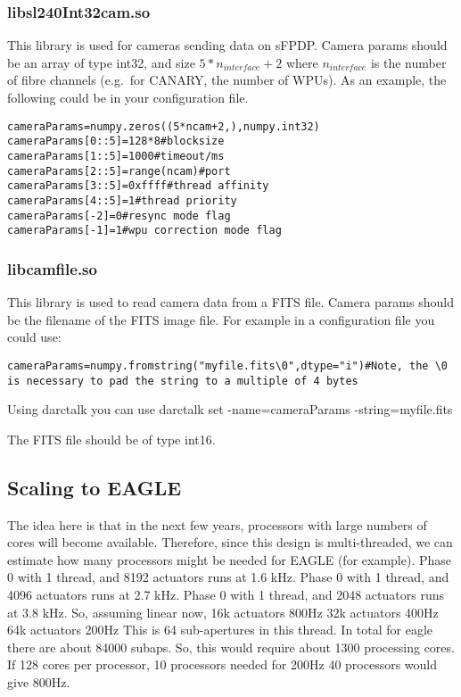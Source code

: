 \documentclass[a4,10pt]{article}
\begin{document}
\subsubsection{libsl240Int32cam.so}
This library is used for cameras sending data on sFPDP.  Camera params
should be an array of type int32, and size $5*n_{interface}+2$ where
$n_{interface}$ is the number of fibre channels (e.g.\ for CANARY, the
number of WPUs).  As an example, the following could be in your
configuration file.
\begin{verbatim}
cameraParams=numpy.zeros((5*ncam+2,),numpy.int32)
cameraParams[0::5]=128*8#blocksize
cameraParams[1::5]=1000#timeout/ms
cameraParams[2::5]=range(ncam)#port
cameraParams[3::5]=0xffff#thread affinity
cameraParams[4::5]=1#thread priority
cameraParams[-2]=0#resync mode flag
cameraParams[-1]=1#wpu correction mode flag
\end{verbatim}

\subsubsection{libcamfile.so}
This library is used to read camera data from a FITS file.
Camera params should be the filename of the FITS image file.
For example in a configuration file you could use:
\begin{verbatim}
cameraParams=numpy.fromstring("myfile.fits\0",dtype="i")#Note, the \0 is necessary to pad the string to a multiple of 4 bytes
\end{verbatim}
Using darctalk you can use darctalk set -name=cameraParams -string=myfile.fits

The FITS file should be of type int16.

\subsection{Scaling to EAGLE}
The idea here is that in the next few years, processors with large
numbers of cores will become available.  Therefore, since this design
is multi-threaded, we can estimate how many processors might be needed
for EAGLE (for example).
Phase 0 with 1 thread, and 8192 actuators runs at 1.6 kHz.
Phase 0 with 1 thread, and 4096 actuators runs at 2.7 kHz.
Phase 0 with 1 thread, and 2048 actuators runs at 3.8 kHz.
So, assuming linear now, 16k actuators 800Hz
32k actuators 400Hz
64k actuators 200Hz
This is 64 sub-apertures in this thread.
In total for eagle there are about 84000 subaps.
So, this would require about 1300 processing cores.
If 128 cores per processor, 10 processors needed for 200Hz
40 processors would give 800Hz.
\end{document}

